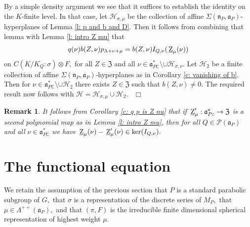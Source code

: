 \documentclass[12pt,a4paper]{article}
\newtheorem{Rem}[Thm]{Remark}
\newenvironment{rem}[0]{\begin{Rem}\noindent\rm}%
{\end{Rem}}
\def\proof{\par\noindent{\it Proof.}{\ }{\ }}
\def\qed{~\hfill\hbox{$\Box$}\medbreak}
\def\msy#1{{\mathbb #1}}
\def\C{{\msy C}}
\def\gs{\sigma}
\def\gS{\Sigma}
\def\got#1{\mathfrak #1}
\def\fa{{\got a}}
\def\fn{{\got n}}
\def\to{\rightarrow}
\def\iC{{\scriptscriptstyle \C}}
\def\cH{{\mathcal H}}
\def\cP{{\mathcal P}}
\numberwithin{Thm}{section}
\numberwithin{equation}{section}
\def\fZ{{\mathfrak Z}}
\def\faPdc{{\fa_{P\iC}^*}}
\def\gL{\Lambda}
\numberwithin{equation}{section}
\def\fZ{{\mathfrak Z}}
\def\gL{\Lambda}
\def\faPdc{\fa_{P\iC}^*}
\def\faP{\fa_P}
\def\ulrmZ{\,\underline{\rm Z}_\mu}
\def\bfhyp{hyperplanes}
\begin{document}
\proof
By a simple density argument we see that it suffices to establish the identity on the 
$K$-finite level.
In that case, let $\cH_{\gs,\mu}$ be the collection of affine $\gS(\fn_P, \faP)$-{\bfhyp} of Lemma \ref{l: p and b and D}.
Then it follows from combining that lemma with Lemma \ref{l: intro Z mu} that
$$
q(\nu) b(Z,\nu) p_{\gL + \nu +\mu} = b(Z, \nu) I_{Q,\nu}( \ulrmZ(\nu))
$$ 
on $C(K/K_Q:\gs ) \otimes F,$ for all $Z \in \fZ$ and all $\nu \in \faPdc\setminus \cup \cH_{\gs, \nu}.$ 
Let $\cH_2$ be a finite collection of affine $\gS(\fn_P, \faP)$-{\bfhyp} as in Corollary \ref{c: vanishing of b}.
Then for $\nu \in \faPdc\setminus \cup \cH_2$ there exists $Z \in \fZ$ such that
$b(Z, \nu) \neq 0.$ The required result now follows with $\cH = \cH_{\gs, \mu} \cup \cH_2.$
\qed

\begin{rem}
\label{r: uniqueness ulrmZ}
 It follows from Corollary \ref{c: q p is Z nu} that if $\ulrmZ': \faPdc \to \fZ$ is a second
polynomial map as in Lemma \ref{l: intro Z mu}, then for all $Q \in \cP(\fa_P)$ and all $\nu \in \faPdc$ 
we have $\ulrmZ(\nu) - \ulrmZ'(\nu) \in \ker({ I}_{Q,\nu}).$
\end{rem} 


\section{The functional equation}
\label{s: functional equation}
 We retain the assumption of the previous section that  $P$ is a standard parabolic
 subgroup of $G,$ that $\gs$ is a representation of the discrete series of $M_P,$ 
 that $\mu \in \gL^{++}(\fa_P),$ and that 
 $(\pi, F)$ is the irreducible finite dimensional spherical representation of  
 highest weight $\mu.$ 
\end{document}
